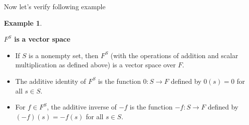\documentclass[
]{book}
\providecommand{\tightlist}{%
  \setlength{\itemsep}{0pt}\setlength{\parskip}{0pt}}
\theoremstyle{definition}
\theoremstyle{definition}
\newtheorem{example}{Example}[chapter]
\theoremstyle{definition}
\theoremstyle{definition}
\theoremstyle{remark}
\begin{document}
Now let's verify following example

\begin{example}
\protect\hypertarget{exm:unnamed-chunk-20}{}\label{exm:unnamed-chunk-20}

\textbf{\(F^S\) is a vector space}

\begin{itemize}
\tightlist
\item
  If \(S\) is a nonempty set, then \(F^S\) (with the operations of addition and scalar multiplication as defined above) is a vector space over \(F\).
\item
  The additive identity of \(F^S\) is the function \(0 \colon S \rightarrow F\) defined by \(0(s) = 0\) for all \(s \in S\).
\item
  For \(f \in F^S\), the additive inverse of \(-f\) is the function \(-f \colon S \rightarrow F\) defined by \((-f)(s) = -f(s)\) for all \(s \in S\).
\end{itemize}

\end{example}
\end{document}

